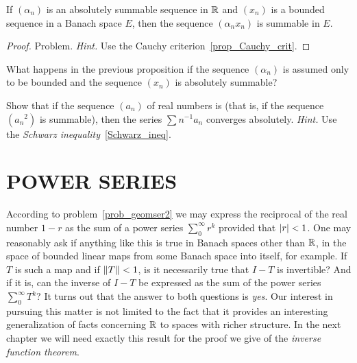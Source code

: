 \begin{prop}\label{prop_abssum_x_bdd}  If $(\alpha_n)$ is an absolutely summable sequence in $\mathbb{R}$
and $(x_n)$ is a bounded sequence in a Banach space $E$, then the sequence $(\alpha_n x_n)$ is
summable in $E$.
\end{prop}

\begin{proof} Problem.  \emph{Hint.}  Use the Cauchy criterion~\ref{prop_Cauchy_crit}.     \ns
\end{proof}

\begin{prob}  What happens in the previous proposition if the sequence $(\alpha_n)$ is assumed
only to be bounded and the sequence $(x_n)$ is absolutely summable?
\end{prob}

\begin{prob} Show that if the sequence $(a_n)$ of real numbers is
 (that is, if the sequence $({a_n}^2)$ is summable), then the series $\sum
n^{-1} a_n$ converges absolutely. \emph{Hint.}  Use the \emph{Schwarz
inequality}~\ref{Schwarz_ineq}.
\end{prob}











\section{POWER SERIES}\label{pow_ser}
According to problem~\ref{prob_geomser2} we may express the reciprocal of the real number $1 -
r$ as the sum of a power series $\sum_0^\infty r^k$ provided that $\lvert r\rvert < 1$.  One may
reasonably ask if anything like this is true in Banach spaces other than $\mathbb{R}$, in the space of
bounded linear maps from some Banach space into itself, for example.  If $T$ is such a map and
if $\lVert T\rVert < 1$, is it necessarily true that $I- T$ is invertible?  And if it is, can the
inverse of $I- T$ be expressed as the sum of the power series $\sum_0^\infty T^k$?  It turns
out that the answer to both questions is \emph{yes}.  Our interest in pursuing this matter is
not limited to the fact that it provides an interesting generalization of facts concerning
$\mathbb{R}$ to spaces with richer structure.  In the next chapter we will need exactly this result
for the proof we give of the \emph{inverse function theorem}.

